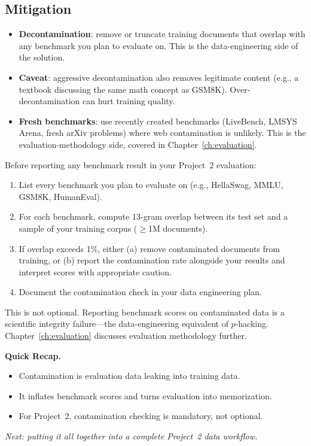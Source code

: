 \subsection{Mitigation}

\begin{itemize}[nosep]
  \item \textbf{Decontamination}: remove or truncate training documents that overlap with any benchmark you plan to evaluate on. This is the data-engineering side of the solution.
  \item \textbf{Caveat}: aggressive decontamination also removes legitimate content (e.g., a textbook discussing the same math concept as GSM8K). Over-decontamination can hurt training quality.
  \item \textbf{Fresh benchmarks}: use recently created benchmarks (LiveBench, LMSYS Arena, fresh arXiv problems) where web contamination is unlikely. This is the evaluation-methodology side, covered in Chapter~\ref{ch:evaluation}.
\end{itemize}

\begin{tcolorbox}[colback=orange!5, colframe=orange!60, title=\textbf{For Project~2: Mandatory Contamination Check}]
Before reporting any benchmark result in your Project~2 evaluation:

\begin{enumerate}[nosep]
  \item List every benchmark you plan to evaluate on (e.g., HellaSwag, MMLU, GSM8K, HumanEval).
  \item For each benchmark, compute 13-gram overlap between its test set and a sample of your training corpus ($\geq$1M documents).
  \item If overlap exceeds 1\%, either (a) remove contaminated documents from training, or (b) report the contamination rate alongside your results and interpret scores with appropriate caution.
  \item Document the contamination check in your data engineering plan.
\end{enumerate}

This is not optional. Reporting benchmark scores on contaminated data is a scientific integrity failure---the data-engineering equivalent of $p$-hacking. Chapter~\ref{ch:evaluation} discusses evaluation methodology further.
\end{tcolorbox}

\begin{quickrecap}
\textbf{Quick Recap.}
\begin{itemize}[nosep,leftmargin=1.5em]
  \item Contamination is evaluation data leaking into training data.
  \item It inflates benchmark scores and turns evaluation into memorization.
  \item For Project~2, contamination checking is mandatory, not optional.
\end{itemize}
\textit{Next: putting it all together into a complete Project~2 data workflow.}
\end{quickrecap}


